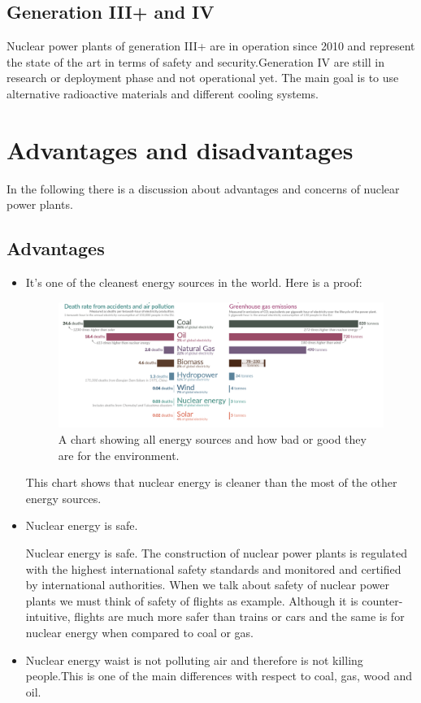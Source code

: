 \documentclass{article}
\begin{document}
\subsection{Generation III+ and IV}
Nuclear power plants of generation III+ are in operation since 2010 and represent the state of the art in terms of safety and security.Generation IV are still in research or deployment phase and not operational yet. The main goal is to use alternative radioactive materials and different cooling systems.

\section{Advantages and disadvantages}
In the following there is a discussion about advantages and concerns of nuclear power plants.

\subsection{Advantages}
\begin{itemize}
    \item It's one of the cleanest energy sources in the world.
    Here is a proof:
    \begin{figure}
        \centering
        \includegraphics[width=1.39\linewidth]{therealproof.png}
        \caption{A chart showing all energy sources and how bad or good they are for the environment\protect\footnotemark.}
        \label{fig:enter-label}
    \end{figure}

This chart shows that nuclear energy is cleaner than the most of the other energy sources.

\item Nuclear energy is safe.

Nuclear energy is safe. The construction of nuclear power plants is regulated with the highest international safety standards and monitored and certified by international authorities. When we talk about safety of nuclear power plants we must think of safety of flights as example. Although it is counter-intuitive, flights are much more safer than trains or cars and the same is for nuclear energy when compared to coal or gas.

\item Nuclear energy waist is not polluting air and therefore is not killing people.This is one of the main differences with respect to coal, gas, wood and oil.


\end{itemize}
\end{document}
